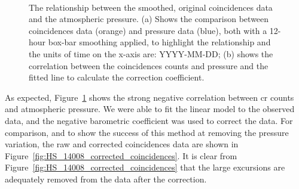 \begin{figure}[ht!]
	\centering
	 \\
	
	\caption{The relationship between the smoothed, original coincidences data and the atmospheric pressure. (a) Shows the comparison between coincidences data (orange) and pressure data (blue), both with a 12-hour box-bar smoothing applied, to highlight the relationship and the units of time on the x-axis are: YYYY-MM-DD; (b) shows the correlation between the coincidences counts and pressure and the fitted line to calculate the correction coefficient.}
	\label{fig:14008_CR_V_P_corr}
\end{figure}



As expected, Figure~\ref{fig:14008_CR_V_P_corr} shows the strong negative correlation between \gls{cr} counts and atmospheric pressure. We were able to fit the linear model to the observed data, and the negative barometric coefficient was used to correct the data. For comparison, and to show the success of this method at removing the pressure variation, the raw and corrected coincidences data are shown in Figure~\ref{fig:HS_14008_corrected_coincidences}. It is clear from Figure~\ref{fig:HS_14008_corrected_coincidences} that the large excursions are adequately removed from the data after the correction.


